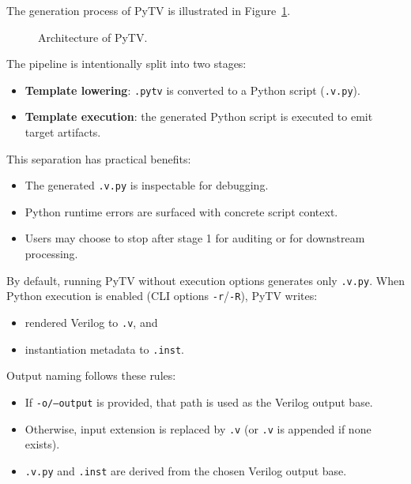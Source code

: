 The generation process of PyTV is illustrated in Figure~\ref{fig:architecture}.

\begin{figure}[htbp]
  \centering
  \caption{Architecture of PyTV.}
  \label{fig:architecture}
\end{figure}

The pipeline is intentionally split into two stages:
\begin{itemize}
  \item \textbf{Template lowering}: \texttt{.pytv} is converted to a Python script (\texttt{.v.py}).
  \item \textbf{Template execution}: the generated Python script is executed to emit target artifacts.
\end{itemize}

This separation has practical benefits:
\begin{itemize}
  \item The generated \texttt{.v.py} is inspectable for debugging.
  \item Python runtime errors are surfaced with concrete script context.
  \item Users may choose to stop after stage 1 for auditing or for downstream processing.
\end{itemize}

By default, running PyTV without execution options generates only \texttt{.v.py}.
When Python execution is enabled (CLI options \texttt{-r}/\texttt{-R}),
PyTV writes:
\begin{itemize}
  \item rendered Verilog to \texttt{.v}, and
  \item instantiation metadata to \texttt{.inst}.
\end{itemize}

Output naming follows these rules:
\begin{itemize}
  \item If \texttt{-o/--output} is provided, that path is used as the Verilog output base.
  \item Otherwise, input extension is replaced by \texttt{.v} (or \texttt{.v} is appended if none exists).
  \item \texttt{.v.py} and \texttt{.inst} are derived from the chosen Verilog output base.
\end{itemize}

